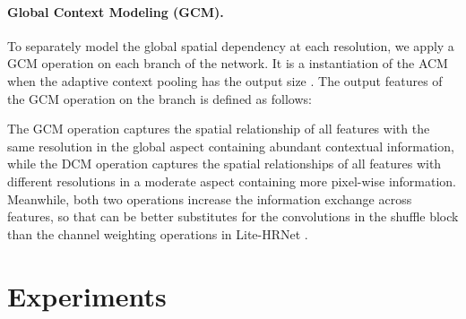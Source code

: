 \documentclass{article}
\begin{document}
\paragraph{Global Context Modeling (GCM).} To separately model the global spatial dependency at each resolution, we apply a GCM operation on each branch of the network. It is a instantiation of the ACM when the adaptive context pooling has the output size . The output features of the GCM operation on the  branch is defined as follows:


The GCM operation captures the spatial relationship of all features with the same resolution in the global aspect containing abundant contextual information, while the DCM operation captures the spatial relationships of all features with different resolutions in a moderate aspect containing more pixel-wise information. Meanwhile, both two operations increase the information exchange across features, so that can be better substitutes for the  convolutions in the shuffle block \cite{ma:shuffle2} than the channel weighting operations in Lite-HRNet \cite{yu:litehrnet}.

\section{Experiments}
\end{document}
